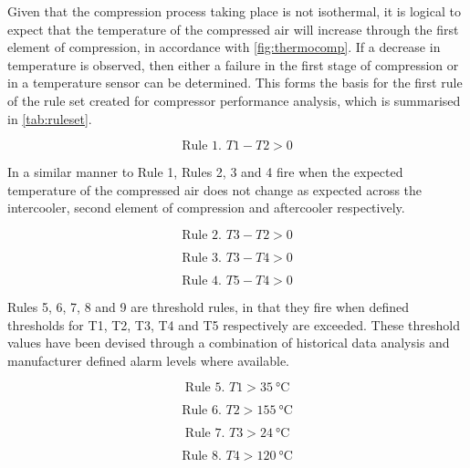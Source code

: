 Given that the compression process taking place is not isothermal, it is logical to expect that the temperature of the compressed air will increase through the first element of compression, in accordance with \autoref{fig:thermocomp}. If a decrease in temperature is observed, then either a failure in the first stage of compression or in a temperature sensor can be determined. This forms the basis for the first rule of the rule set created for compressor performance analysis, which is summarised in \autoref{tab:ruleset}.

\begin{equation}
\text{Rule 1. } T1 - T2 > 0
\label{eq:rule1}
\end{equation}

In a similar manner to Rule 1, Rules 2, 3 and 4 fire when the expected temperature of the compressed air does not change as expected across the intercooler, second element of compression and aftercooler respectively.

\begin{equation}
\text{Rule 2. } T3 - T2 >0
\label{eq:rule2}
\end{equation}

\begin{equation}
\text{Rule 3. } T3 - T4 >0
\label{eq:rule3}
\end{equation}

\begin{equation}
\text{Rule 4. } T5 - T4 > 0
\label{eq:rule4}
\end{equation}

Rules 5, 6, 7, 8 and 9 are threshold rules, in that they fire when defined thresholds for T1, T2, T3, T4 and T5 respectively are exceeded. These threshold values have been devised through a combination of historical data analysis and manufacturer defined alarm levels where available.

\begin{equation}
\text{Rule 5. } T1 > \SI{35}{\degreeCelsius}
\label{eq:rule5}
\end{equation}

\begin{equation}
\text{Rule 6. } T2 > \SI{155}{\degreeCelsius}
\label{eq:rule6}
\end{equation}

\begin{equation}
\text{Rule 7. } T3 > \SI{24}{\degreeCelsius}
\label{eq:rule7}
\end{equation}

\begin{equation}
\text{Rule 8. } T4 > \SI{120}{\degreeCelsius}
\label{eq:rule8}
\end{equation}

